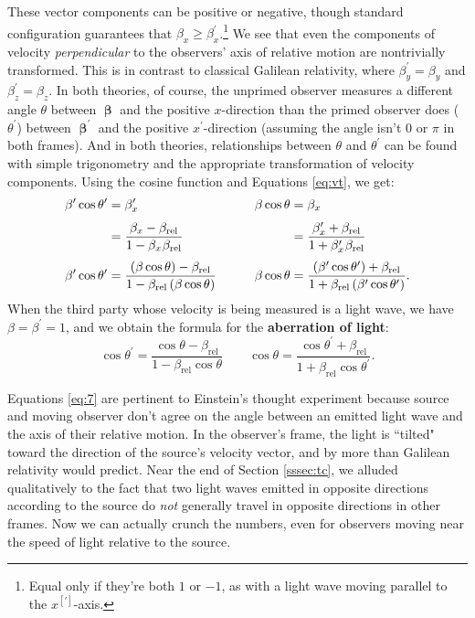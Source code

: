 \documentclass[12pt]{article}
\newcommand{\vvbeta}{\bm{\upbeta}}
\begin{document}
These vector components can be positive or negative, though standard configuration guarantees that $ \beta_x \geq \beta_x^\prime $.\footnote{Equal only if they're both $1$ or $-1$, as with a light wave moving parallel to the $x^{[\prime]}$-axis.} We see that even the components of velocity \emph{perpendicular} to the observers' axis of relative motion are nontrivially transformed. This is in contrast to classical Galilean relativity, where $\beta_y^{\prime} = \beta_y$ and $\beta_z^{\prime} = \beta_z$. In both theories, of course, the unprimed observer measures a different angle $\theta$ between $\vvbeta$ and the positive $x$-direction than the primed observer does ($\theta^\prime$) between $\vvbeta^{\prime}$ and the positive $x^\prime$-direction (assuming the angle isn't $0$ or $\pi$ in both frames). And in both theories, relationships between $\theta$ and $\theta^{\prime}$ can be found with simple trigonometry and the appropriate transformation of velocity components. Using the cosine function and Equations \ref{eq:vt}, we get:
\begin{equation*}
\begin{aligned}
\beta^\prime \cos \theta^\prime &= \beta_x^\prime &\qquad \beta \cos \theta &= \beta_x \\[3pt]
&= \dfrac{\beta_x - \beta_{\textrm{rel}}}{1 - \beta_{x} \mkern1mu \beta_{\textrm{rel}}} &\qquad &= \dfrac{\beta_x^\prime + \beta_{\textrm{rel}}}{1 + \beta_x^\prime \mkern1mu \beta_{\textrm{rel}}} \\[3pt]
\beta^\prime \cos \theta^\prime &= \frac{\left( \beta \cos \theta \right) - \beta_{\textrm{rel}}}{1 - \beta_{\textrm{rel}} \left( \beta \cos \theta \right)} &\qquad \beta \cos \theta &=\frac{\left( \beta^\prime \cos \theta^\prime \right) + \beta_{\textrm{rel}}}{1 + \beta_{\textrm{rel}} \left( \beta^\prime \cos \theta^\prime \right)} .
\end{aligned}
\end{equation*}
When the third party whose velocity is being measured is a light wave, we have $\beta = \beta^\prime = 1$, and we obtain the formula for the \textbf{aberration of light}:
\begin{equation}\label{eq:7}
\cos \theta^\prime =\frac{\cos \theta - \beta_{\textrm{rel}}}{1 - \beta_{\textrm{rel}} \cos \theta} \qquad \cos \theta =\frac{\cos \theta^\prime + \beta_{\textrm{rel}}}{1 + \beta_{\textrm{rel}} \cos \theta^\prime}.
\end{equation}

Equations \ref{eq:7} are pertinent to Einstein's thought experiment because source and moving observer don't agree on the angle between an emitted light wave and the axis of their relative motion. In the observer's frame, the light is ``tilted" toward the direction of the source's velocity vector, and by more than Galilean relativity would predict. Near the end of Section \ref{sssec:tc}, we alluded qualitatively to the fact that two light waves emitted in opposite directions according to the source do \emph{not} generally travel in opposite directions in other frames. Now we can actually crunch the numbers, even for observers moving near the speed of light relative to the source.
\end{document}
